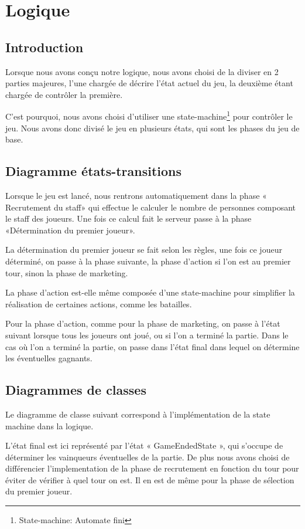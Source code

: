\chapter{Logique} \label{chapter:logique}
\section{Introduction}
Lorsque nous avons conçu notre logique, nous avons choisi de la diviser en 2
parties majeures, l'une chargée de décrire l'état actuel du jeu, la deuxième
étant chargée de contrôler la première.

C'est pourquoi, nous avons choisi d'utiliser une
state-machine\footnote{State-machine: Automate fini} pour contrôler le jeu.
Nous avons donc divisé le jeu en plusieurs états, qui sont les phases du jeu de base.

\section{Diagramme états-transitions}

Lorsque le jeu est lancé, nous rentrons automatiquement dans la phase «
Recrutement du staff» qui effectue le calculer le nombre de
personnes composant le staff des joueurs.
Une fois ce calcul fait le serveur passe à la phase «Détermination du premier joueur».

La détermination du premier joueur se fait selon les règles, une fois ce joueur
déterminé, on passe à la phase suivante, la phase d'action si l'on est au premier
tour, sinon la phase de marketing.

La phase d'action est-elle même composée d'une state-machine pour simplifier la
réalisation de certaines actions, comme les batailles.

Pour la phase d'action, comme pour la phase de marketing, on passe à l'état
suivant lorsque tous les joueurs ont joué, ou si l'on a terminé la partie.
Dans le cas où l'on a terminé la partie, on passe dans l'état final dans lequel
on détermine les éventuelles gagnants.

\section{Diagrammes de classes}
Le diagramme de classe suivant correspond à l'implémentation de la state machine
dans la logique.

L'état final est ici représenté par l'état « GameEndedState », qui s'occupe de
déterminer les vainqueurs éventuelles de la partie.
De plus nous avons choisi de différencier l'implementation de la phase de
recrutement en fonction du tour pour éviter de vérifier à quel tour on est.
Il en est de même pour la phase de sélection du premier joueur.

